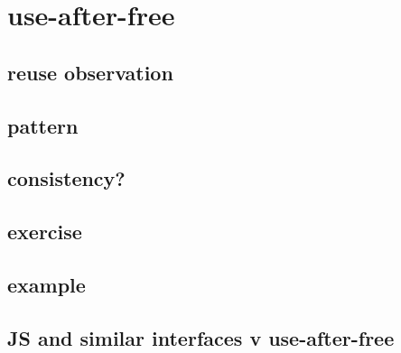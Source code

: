 \section{use-after-free}


\subsection{reuse observation}


\subsection{pattern}


\subsection{consistency?}


\subsection{exercise}


\subsection{example}


\subsection{JS and similar interfaces v use-after-free}

